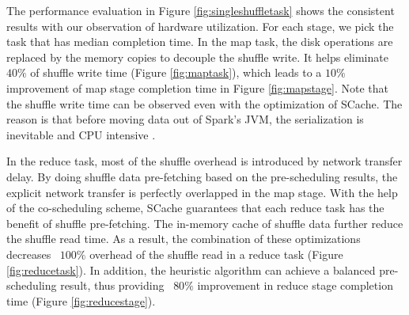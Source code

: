 The performance evaluation in Figure \ref{fig:singleshuffletask} shows the consistent results with our observation of hardware utilization. 
For each stage, we pick the task that has median completion time. 
In the map task, the disk operations are replaced by the memory copies to decouple the shuffle write. 
It helps eliminate $40\%$ of shuffle write time (Figure \ref{fig:maptask}), which leads to a $10\%$ improvement of map stage completion time in Figure \ref{fig:mapstage}. 
Note that the shuffle write time can be observed even with the optimization of SCache. 
The reason is that before moving data out of Spark's JVM, the serialization is inevitable and CPU intensive \cite{makingsense}. 

In the reduce task, most of the shuffle overhead is introduced by network transfer delay. 
By doing shuffle data pre-fetching based on the pre-scheduling results, the explicit network transfer is perfectly overlapped in the map stage. 
With the help of the co-scheduling scheme, SCache guarantees that each reduce task has the benefit of shuffle pre-fetching. 
The in-memory cache of shuffle data further reduce the shuffle read time. 
As a result, the combination of these optimizations decreases ~$100\%$ overhead of the shuffle read in a reduce task (Figure \ref{fig:reducetask}). 
In addition, the heuristic algorithm can achieve a balanced pre-scheduling result, thus providing ~$80\%$ improvement in reduce stage completion time (Figure \ref{fig:reducestage}).

